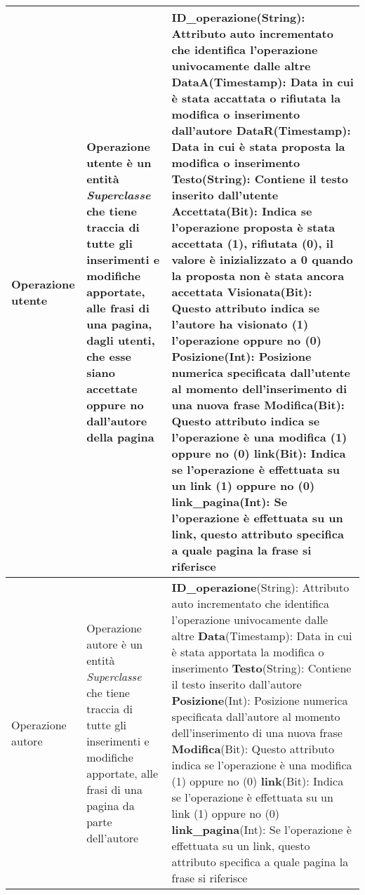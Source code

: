 \begin{longtable}{|p{2.5cm}|p{6cm}|L|}
\hline
Operazione utente& 
Operazione utente è un entità \textit{Superclasse} che tiene traccia di tutte gli inserimenti e modifiche apportate, alle frasi di una pagina, dagli utenti, che esse siano accettate oppure no dall'autore della pagina &
\textbf{ID\_operazione}(String): Attributo auto incrementato che identifica l'operazione univocamente dalle altre\newline
\textbf{DataA}(Timestamp): Data in cui è stata accattata o rifiutata la modifica o inserimento dall'autore \newline
\textbf{DataR}(Timestamp): Data in cui è stata proposta la modifica o inserimento \newline
\textbf{Testo}(String): Contiene il testo inserito dall'utente \newline
\textbf{Accettata}(Bit): Indica se l'operazione proposta è stata accettata (1), rifiutata (0), il valore è inizializzato a 0 quando la proposta non è stata ancora accettata\newline
\textbf{Visionata}(Bit): Questo attributo indica se l'autore ha visionato (1) l'operazione oppure no (0) \newline
\textbf{Posizione}(Int): Posizione numerica specificata dall'utente al momento dell'inserimento di una nuova frase \newline
\textbf{Modifica}(Bit): Questo attributo indica se l'operazione è una modifica (1) oppure no (0)\newline
\textbf{link}(Bit): Indica se l'operazione è effettuata su un link (1) oppure no (0)\newline
\textbf{link\_pagina}(Int): Se l'operazione è effettuata su un link, questo attributo specifica a quale pagina la frase si riferisce\\

\hline
Operazione autore & 
Operazione autore è un entità \textit{Superclasse} che tiene traccia di tutte gli inserimenti e modifiche apportate, alle frasi di una pagina da parte dell'autore &
\textbf{ID\_operazione}(String): Attributo auto incrementato che identifica l'operazione univocamente dalle altre\newline
\textbf{Data}(Timestamp): Data in cui è stata apportata la modifica o inserimento \newline
\textbf{Testo}(String): Contiene il testo inserito dall'autore \newline
\textbf{Posizione}(Int): Posizione numerica specificata dall'autore al momento dell'inserimento di una nuova frase \newline
\textbf{Modifica}(Bit): Questo attributo indica se l'operazione è una modifica (1) oppure no (0)\newline
\textbf{link}(Bit): Indica se l'operazione è effettuata su un link (1) oppure no (0)\newline
\textbf{link\_pagina}(Int): Se l'operazione è effettuata su un link, questo attributo specifica a quale pagina la frase si riferisce\\

\hline
\end{longtable}